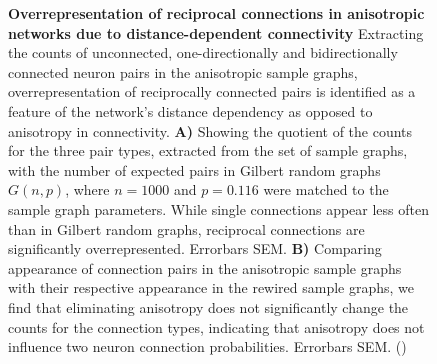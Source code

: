 \begin{figure}[ht]
  \centering
  \vspace{0.2cm}
  \caption{\textbf{Overrepresentation of reciprocal connections in
      anisotropic networks due to distance-dependent connectivity}
    Extracting the counts of unconnected, one-directionally and
    bidirectionally connected neuron pairs in the anisotropic sample
    graphs, overrepresentation of reciprocally connected pairs is
    identified as a feature of the network's distance dependency as
    opposed to anisotropy in connectivity. \textbf{A)} Showing the
    quotient of the counts for the three pair types, extracted from the
    set of sample graphs, with the number of expected pairs in Gilbert
    random graphs $G(n,p)$, where $n=1000$ and $p=0.116$ were matched
    to the sample graph parameters. While single connections appear
    less often than in Gilbert random graphs, reciprocal connections
    are significantly overrepresented. Errorbars SEM. \textbf{B)}
    Comparing appearance of connection pairs in the anisotropic sample
    graphs with their respective appearance in the rewired sample
    graphs, we find that eliminating anisotropy does not significantly
    change the counts for the connection types, indicating that
    anisotropy does not influence two neuron connection
    probabilities. Errorbars SEM.  ()}
  \label{fig:two_neuron_probs}
\end{figure}  




